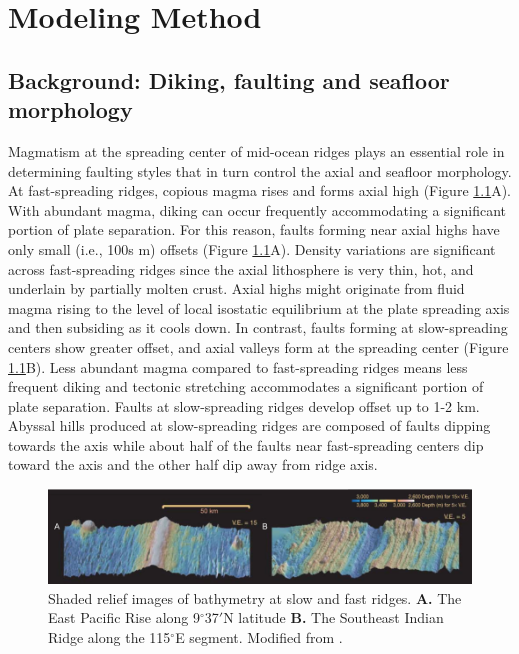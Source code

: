 \documentclass[letterpaper,12pt,notitle]{memphisthesis}                     %
\begin{document}
\chapter{Modeling Method}

\section{Background: Diking, faulting and seafloor morphology}
Magmatism at the spreading center of mid-ocean ridges plays an essential role in determining faulting styles that in turn control the axial and seafloor morphology. At fast-spreading ridges, copious magma rises and forms axial high (Figure \ref{fig:ridgebathymetry}A). With abundant magma, diking can occur frequently accommodating a significant portion of plate separation. For this reason, faults forming near axial highs have only small (i.e., 100s m) offsets (Figure \ref{fig:ridgebathymetry}A). Density variations are significant across fast-spreading ridges since the axial lithosphere is very thin, hot, and underlain by partially molten crust. Axial highs might originate from fluid magma rising to the level of local isostatic equilibrium at the plate spreading axis and then subsiding as it cools down. In contrast, faults forming at slow-spreading centers show greater offset, and axial valleys form at the spreading center (Figure \ref{fig:ridgebathymetry}B). Less abundant magma compared to fast-spreading ridges means less frequent diking and tectonic stretching accommodates a significant portion of plate separation. Faults at slow-spreading ridges develop offset up to 1-2 km. Abyssal hills produced at slow-spreading ridges are composed of faults dipping towards the axis while about half of the faults near fast-spreading centers dip toward the axis and the other half dip away from ridge axis.

\begin{figure}[!htb]
	\centering
	\includegraphics[width=0.99\linewidth]{./figs/bathy_buck.png}
	\caption{Shaded relief images of bathymetry at slow and fast ridges. \textbf{A.} The East Pacific Rise along 9$^\circ$37$'$N latitude \textbf{B.} The Southeast Indian Ridge along the 115$^\circ$E segment. Modified from \citet{Buck2005}.}
	\label{fig:ridgebathymetry}
\end{figure}
\end{document}
